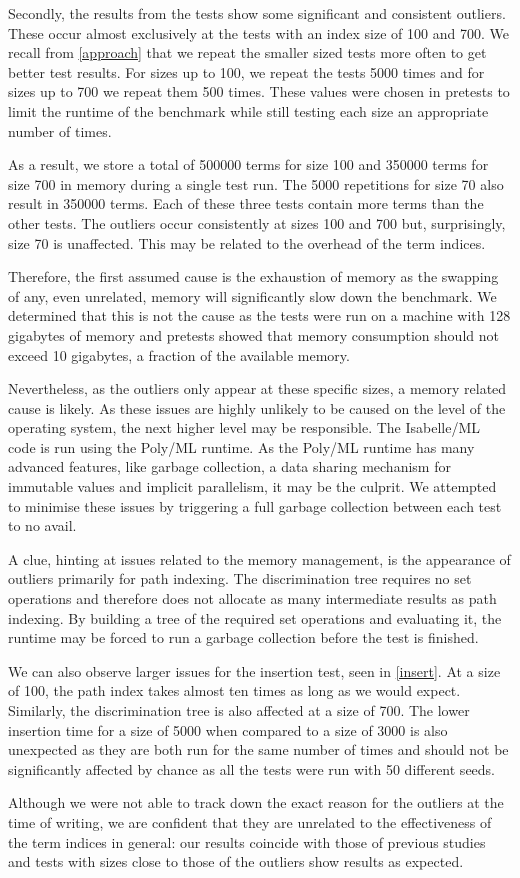 Secondly, the results from the tests show some significant and consistent outliers. These occur almost exclusively at the tests with an index size of 100 and 700. We recall from \cref{approach} that we repeat the smaller sized tests more often to get better test results. For sizes up to 100, we repeat the tests 5000 times and for sizes up to 700 we repeat them 500 times. These values were chosen in pretests to limit the runtime of the benchmark while still testing each size an appropriate number of times.

As a result, we store a total of 500000 terms for size 100 and 350000 terms for size 700 in memory during a single test run. The 5000 repetitions for size 70 also result in 350000 terms.
Each of these three tests contain more terms than the other tests.
The outliers occur consistently at sizes 100 and 700 but, surprisingly, size 70 is unaffected. This may be related to the overhead of the term indices.

Therefore, the first assumed cause is the exhaustion of memory as the swapping of any, even unrelated, memory will significantly slow down the benchmark. We determined that this is not the cause as the tests were run on a machine with 128 gigabytes of memory and pretests showed that memory consumption should not exceed 10 gigabytes, a fraction of the available memory.

Nevertheless, as the outliers only appear at these specific sizes, a memory related cause is likely. As these issues are highly unlikely to be caused on the level of the operating system, the next higher level may be responsible. The Isabelle/ML code is run using the Poly/ML runtime. As the Poly/ML runtime has many advanced features, like garbage collection, a data sharing mechanism for immutable values and implicit parallelism, it may be the culprit. We attempted to minimise these issues by triggering a full garbage collection between each test to no avail.

A clue, hinting at issues related to the memory management, is the appearance of outliers primarily for path indexing. The discrimination tree requires no set operations and therefore does not allocate as many intermediate results as path indexing. By building a tree of the required set operations and evaluating it, the runtime may be forced to run a garbage collection before the test is finished.

We can also observe larger issues for the insertion test, seen in \cref{insert}. At a size of 100, the path index takes almost ten times as long as we would expect. Similarly, the discrimination tree is also affected at a size of 700. The lower insertion time for a size of 5000 when compared to a size of 3000 is also unexpected as they are both run for the same number of times and should not be significantly affected by chance as all the tests were run with 50 different seeds.

Although we were not able to track down the exact reason for the outliers at the time of writing, we are confident that they are unrelated to the effectiveness of the term indices in general: our results coincide with those of previous studies \cite{stickel_path-indexing_1989,mccune_experiments_1992,carbonell_comparison_1995} and tests with sizes close to those of the outliers show results as expected.

